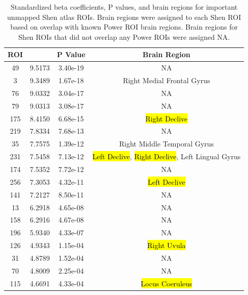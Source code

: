 \documentclass[10pt,letterpaper]{article}\usepackage[]{graphicx}\usepackage[]{color}
\begin{document}
\begin{table}[H]
	\centering
	\caption{Standardized beta coefficients, P values, and brain regions for important unmapped Shen atlas ROIs. Brain regions were assigned to each Shen ROI based on overlap with known Power ROI brain regions. Brain regions for Shen ROIs that did not overlap any Power ROIs were assigned NA.}\label{tab:unmapped-shen-tab}
\begin{tabular}[h!]{cccc}\toprule
	\textbf{ROI} & \bm{$\beta_a$} & \textbf{P Value} & \textbf{Brain Region} \\ \midrule
	49 & 9.5173 & 3.40e-19 & NA \\
	3 & 9.3489 & 1.67e-18 & Right Medial Frontal Gyrus \\
	76 & 9.0332 & 3.04e-17 & NA \\
	79 & 9.0313 & 3.08e-17 & NA \\
	175 & 8.4150 & 6.68e-15 & \hl{Right Declive} \\
	219 & 7.8334 & 7.68e-13 & NA\\
	35 & 7.7575 & 1.39e-12 & Right Middle Temporal Gyrus\\
	231 & 7.5458 & 7.13e-12 & \hl{Left Declive}, \hl{Right Declive}, Left Lingual Gyrus\\
	174 & 7.5352 & 7.72e-12 & NA \\
	256 & 7.3053 & 4.32e-11 & \hl{Left Declive} \\
	141 & 7.2127 & 8.50e-11 & NA \\
	13 & 6.2918 & 4.65e-08 & NA \\
	158 & 6.2916 & 4.67e-08 & NA \\
	196 & 5.9340 & 4.33e-07 & NA \\
	126 & 4.9343 & 1.15e-04 & \hl{Right Uvula} \\
	31 & 4.8789 & 1.52e-04 & NA \\
	70 & 4.8009 & 2.25e-04 & NA \\
	115 & 4.6691 & 4.33e-04 & \hl{Locus Coeruleus} \\ \bottomrule
\end{tabular}
\end{table}
\end{document}
